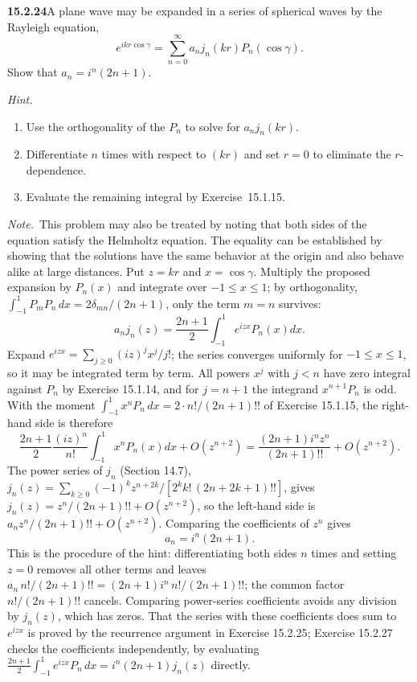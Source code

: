 \par\bigskip
\noindent\textbf{15.2.24}\quad A plane wave may be expanded in a
series of spherical waves by the Rayleigh equation,
\[
e^{ikr\cos\gamma}=\sum_{n=0}^{\infty}a_{n}j_{n}(kr)P_{n}(\cos\gamma).
\]
Show that $a_{n}=i^{n}(2n+1)$.
\par\emph{Hint.}
\begin{enumerate}
\item[1.] Use the orthogonality of the $P_{n}$ to solve for
$a_{n}j_{n}(kr)$.
\item[2.] Differentiate $n$ times with respect to $(kr)$ and set
$r=0$ to eliminate the $r$-dependence.
\item[3.] Evaluate the remaining integral by Exercise~15.1.15.
\end{enumerate}
\par\emph{Note.}~This problem may also be treated by noting that both
sides of the equation satisfy the Helmholtz equation. The equality
can be established by showing that the solutions have the same
behavior at the origin and also behave alike at large distances.
\solution
Put $z=kr$ and $x=\cos\gamma$. Multiply the proposed expansion by
$P_n(x)$ and integrate over $-1\le x\le1$; by orthogonality,
$\int_{-1}^1P_mP_n\,dx=2\delta_{mn}/(2n+1)$, only the term $m=n$
survives:
\[
a_nj_n(z)=\frac{2n+1}{2}\int_{-1}^1e^{izx}P_n(x)dx.
\]
Expand $e^{izx}=\sum_{j\ge0}(iz)^jx^j/j!$; the series converges
uniformly for $-1\le x\le1$, so it may be integrated term by term.
All powers $x^j$ with $j<n$ have zero integral against $P_n$ by
Exercise 15.1.14, and for $j=n+1$ the integrand $x^{n+1}P_n$ is odd.
With the moment $\int_{-1}^1x^nP_n\,dx=2\cdot n!/(2n+1)!!$ of
Exercise 15.1.15, the right-hand side is therefore
\[
\frac{2n+1}{2}\frac{(iz)^n}{n!}
 \int_{-1}^1x^nP_n(x)dx+O(z^{n+2})
=\frac{(2n+1)i^nz^n}{(2n+1)!!}+O(z^{n+2}).
\]
The power series of $j_n$ (Section 14.7),
$j_n(z)=\sum_{k\ge0}(-1)^kz^{n+2k}/[2^kk!\,(2n+2k+1)!!]$, gives
$j_n(z)=z^n/(2n+1)!!+O(z^{n+2})$, so the left-hand side is
$a_nz^n/(2n+1)!!+O(z^{n+2})$. Comparing the coefficients of $z^n$ gives
\[
\boxed{a_n=i^n(2n+1)}.
\]
This is the procedure of the hint: differentiating both sides $n$ times
and setting $z=0$ removes all other terms and leaves
$a_n\,n!/(2n+1)!!=(2n+1)i^n\,n!/(2n+1)!!$; the common factor
$n!/(2n+1)!!$ cancels. Comparing power-series coefficients avoids any
division by $j_n(z)$, which has zeros. That the series with these
coefficients does sum to $e^{izx}$ is proved by the recurrence
argument in Exercise 15.2.25; Exercise 15.2.27 checks the coefficients
independently, by evaluating
$\frac{2n+1}2\int_{-1}^1e^{izx}P_n\,dx=i^n(2n+1)j_n(z)$ directly.

